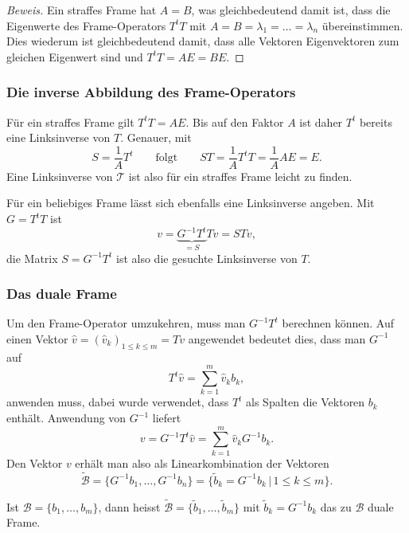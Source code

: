 \begin{proof}[Beweis]
Ein straffes Frame hat $A=B$, was gleichbedeutend damit ist, dass
die Eigenwerte des Frame-Operators $T^tT$ mit 
$A=B=\lambda_1=\dots=\lambda_n$ übereinstimmen.
Dies wiederum ist gleichbedeutend damit, dass alle Vektoren Eigenvektoren
zum gleichen Eigenwert sind und $T^tT=AE=BE$.
\end{proof}

\subsubsection{Die inverse Abbildung des Frame-Operators}
Für ein straffes Frame gilt $T^tT  = AE$.
Bis auf den Faktor $A$ ist daher $T^t$ bereits eine Linksinverse von $T$.
Genauer, mit
\[
S=\frac1{A} T^t
\qquad\text{folgt}\qquad
ST
=
\frac1{A} T^tT
=
\frac1{A} AE
=
E.
\]
Eine Linksinverse von $\mathcal{T}$ ist also für ein straffes Frame
leicht zu finden.

Für ein beliebiges Frame lässt sich ebenfalls eine Linksinverse angeben.
Mit $G=T^tT$ ist
\[
v
=
\underbrace{G^{-1}T^t}_{\displaystyle=S}Tv
=
STv,
\]
die Matrix $S=G^{-1}T^t$ ist also die gesuchte Linksinverse von $T$.

\subsubsection{Das duale Frame}
Um den Frame-Operator umzukehren, muss man $G^{-1}T^t$ berechnen
können.
Auf einen Vektor $\hat{v} = (\hat{v}_k)_{1\le k\le m} = Tv$ angewendet
bedeutet dies, dass man $G^{-1}$ auf
\[
T^t \hat{v} = \sum_{k=1}^m \hat{v}_k  b_k,
\]
anwenden muss, dabei wurde verwendet, dass $T^t$ als Spalten die
Vektoren $b_k$ enthält.
Anwendung von $G^{-1}$ liefert
\[
v
=
G^{-1} T^t \hat{v}
=
\sum_{k=1}^m \hat{v}_k G^{-1}b_k.
\]
Den Vektor $v$ erhält man also als Linearkombination der Vektoren
\[
\tilde{\mathcal{B}}
=
\{ G^{-1}b_1,\dots,G^{-1}b_n\}
=
\{ \tilde{b}_k = G^{-1}b_k\,|\, 1\le k\le m\}.
\]

\begin{definition}
\label{definition:dualesframe}
Ist $\mathcal{B}=\{b_1,\dots,b_m\}$, dann heisst
$\tilde{\mathcal{B}} = \{\tilde{b}_1,\dots,\tilde{b}_m\}$ 
mit
$\tilde{b}_k=G^{-1} b_k$
das zu $\mathcal{B}$ duale Frame.
\end{definition}

